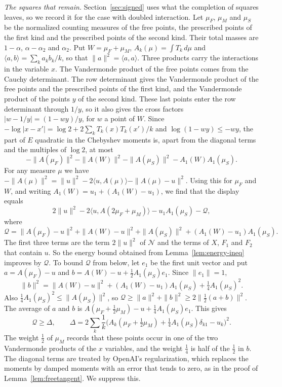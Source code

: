 \documentclass[11pt]{amsart}
\theoremstyle{definition}
\theoremstyle{remark}
\numberwithin{equation}{section}
\begin{document}
\emph{The squares that remain.} Section~\ref{sec:signed} uses what the completion of squares leaves, so we record it for the case with doubled
interaction. Let $\mu_F$, $\mu_M$ and $\mu_S$ be the normalized counting measures of the free points, the prescribed points of the first kind and the
prescribed points of the second kind. Their total masses are $1-\alpha$, $\alpha-\alpha_2$ and $\alpha_2$. Put $W=\mu_F+\mu_M$,
$A_k(\mu)=\int T_k\,d\mu$ and $\langle a,b\rangle=\sum_ka_kb_k/k$, so that $\|a\|^2=\langle a,a\rangle$. Three products carry the interactions
in the variable $x$. The Vandermonde product of the free points comes from the Cauchy determinant. The row determinant gives the Vandermonde product of the
free points and the prescribed points of the first kind, and the Vandermonde product of the points $y$ of the second kind. These last points
enter the row determinant through $1/y$, so it also gives the cross factors $|w-1/y|=(1-wy)/y$, for $w$ a point of $W$.
Since $-\log|x-x'|=\log2+2\sum_kT_k(x)T_k(x')/k$ and $\log(1-wy)\le-wy$, the part of $E$ quadratic in the Chebyshev moments is, apart from the
diagonal terms and the multiples of $\log2$, at most
\[
 -\|A(\mu_F)\|^2-\|A(W)\|^2-\|A(\mu_S)\|^2-A_1(W)A_1(\mu_S).
\]
For any measure $\mu$ we have $-\|A(\mu)\|^2=\|u\|^2-2\langle u,A(\mu)\rangle-\|A(\mu)-u\|^2$. Using this for $\mu_F$ and $W$, and writing
$A_1(W)=u_1+(A_1(W)-u_1)$, we find that the display equals
\[
 2\|u\|^2-2\langle u,A(2\mu_F+\mu_M)\rangle-u_1A_1(\mu_S)-\mathcal Q,
\]
where
\[
 \mathcal Q=\|A(\mu_F)-u\|^2+\|A(W)-u\|^2+\|A(\mu_S)\|^2+(A_1(W)-u_1)A_1(\mu_S).
\]
The first three terms are the term $2\|u\|^2$ of $\mathcal N$ and the terms of $X$, $F_1$ and $F_2$ that contain $u$. So the energy bound obtained from
Lemma~\ref{lem:energy-ineq} improves by $\mathcal Q$. To bound $\mathcal Q$ from below, let $e_1$ be the first
unit vector and put $a=A(\mu_F)-u$ and $b=A(W)-u+\frac12A_1(\mu_S)e_1$. Since $\|e_1\|=1$,
\[
 \|b\|^2=\|A(W)-u\|^2+(A_1(W)-u_1)A_1(\mu_S)+\tfrac14A_1(\mu_S)^2 .
\]
Also $\frac14A_1(\mu_S)^2\le\|A(\mu_S)\|^2$, so $\mathcal Q\ge\|a\|^2+\|b\|^2\ge2\|\frac12(a+b)\|^2$. The average of $a$ and $b$ is
$A(\mu_F+\frac12\mu_M)-u+\frac14A_1(\mu_S)e_1$. This gives
\begin{equation}\label{eq:squares}
 \mathcal Q\ge\Delta,\qquad\Delta=2\sum_k\frac1k\bigl(A_k(\mu_F+\tfrac12\mu_M)+\tfrac14A_1(\mu_S)\delta_{k1}-u_k\bigr)^2 .
\end{equation}
The weight $\frac12$ of $\mu_M$ records that these points occur in one of the two Vandermonde products of the $x$ variables, and the weight
$\frac14$ is half of the $\frac12$ in $b$. The diagonal terms are treated by OpenAI's regularization, which replaces the moments by damped moments
with an error that tends to zero, as in the proof of Lemma~\ref{lem:freetangent}. We suppress this.
\end{document}
